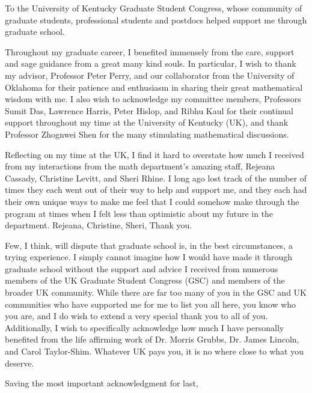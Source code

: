 \documentclass[final, leqno]{ukthesis}
\numberwithin{equation}{chapter}
\begin{document}
\frontmatter
\maketitle
\begin{dedication}
	To the University of Kentucky Graduate Student Congress, whose community of graduate students, 
	professional students and postdocs helped support me through graduate school.
\end{dedication}
\begin{acknowledgments}
	Throughout my graduate career, I benefited immensely from the care, support and 
	sage guidance from a great many kind souls. In particular, I wish to thank my advisor, 
	Professor Peter Perry, and our collaborator from the University of Oklahoma for
	their patience and enthusiasm in sharing their great mathematical wisdom with me.
	I also wish to acknowledge my committee members, Professors Sumit Das, Lawrence 
	Harris, Peter Hislop, and Ribhu Kaul for their continual support throughout my 
	time at the University of Kentucky (UK), and thank Professor Zhognwei Shen 
	for the many stimulating mathematical discussions.

	Reflecting on my time at the UK, I find it hard to overstate 
	how much I received from my interactions from the math department's amazing 
	staff, Rejeana Cassady, Christine Levitt, and Sheri Rhine. I long ago lost 
	track of the number of times they each went out of their way to help and 
	support me, and they each had their own unique ways to make me feel that 
	I could somehow make through the program at times when I felt less
	than optimistic about my future in the department. Rejeana, Christine, Sheri,
	Thank you.

	Few, I think, will dispute that graduate school is, in the best circumstances,
	a trying experience. I simply cannot imagine how I would have made it through
	graduate school without the support and advice I received from numerous members
	of the UK Graduate Student Congress (GSC) and members of the 
	broader UK community. While there are far too many of you in the GSC and 
	UK communities who have supported me for me to list you all here, you know who 
	you are, and I do wish to extend a very special thank you to all of you. 
	Additionally, I wish to specifically acknowledge how much I have personally 
	benefited from the life affirming work of Dr. Morris Grubbs, Dr. James Lincoln, 
	and Carol Taylor-Shim. Whatever UK pays you, it is no where close to what you 
	deserve.

	Saving the most important acknowledgment for last, 
\end{acknowledgments}
\end{document}
